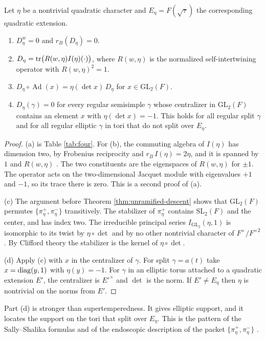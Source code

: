 \begin{theorem}\label{thm:Deta}Let $\eta$ be a nontrivial quadratic character and $E_\eta=F(\sqrt\tau)$ the corresponding quadratic extension.
\begin{enumerate}[label=(\alph*),leftmargin=*]
\item $D_\eta^w=0$ and $r_B(D_\eta)=0$.
\item $D_\eta=\operatorname{tr}\bigl(R(w,\eta)I(\eta)(\cdot)\bigr)$, where $R(w,\eta)$ is the normalized self-intertwining operator with $R(w,\eta)^2=1$.
\item $D_\eta\circ\operatorname{Ad}(x)=\eta(\det x)\,D_\eta$ for $x\in\mathrm{GL}_2(F)$.
\item $D_\eta(\gamma)=0$ for every regular semisimple $\gamma$ whose centralizer in $\mathrm{GL}_2(F)$ contains an element $x$ with $\eta(\det x)=-1$. This holds for all regular split $\gamma$ and for all regular elliptic $\gamma$ in tori that do not split over $E_\eta$.
\end{enumerate}
\end{theorem}
\begin{proof}
(a) is Table \ref{tab:four}. For (b), the commuting algebra of $I(\eta)$ has dimension two, by Frobenius reciprocity and $r_B\,I(\eta)=2\eta$, and it is spanned by $1$ and $R(w,\eta)$ \cite{Ke82}. The two constituents are the eigenspaces of $R(w,\eta)$ for $\pm1$. The operator acts on the two-dimensional Jacquet module with eigenvalues $+1$ and $-1$, so its trace there is zero. This is a second proof of (a).

(c) The argument before Theorem \ref{thm:unramified-descent} shows that $\mathrm{GL}_2(F)$ permutes $\{\pi_\eta^+,\pi_\eta^-\}$ transitively. The stabilizer of $\pi_\eta^+$ contains $\mathrm{SL}_2(F)$ and the center, and has index two. The irreducible principal series $I_{\mathrm{GL}_2}(\eta,1)$ is isomorphic to its twist by $\eta\circ\det$ and by no other nontrivial character of $F^\times/F^{\times2}$. By Clifford theory the stabilizer is the kernel of $\eta\circ\det$.

(d) Apply (c) with $x$ in the centralizer of $\gamma$. For split $\gamma=a(t)$ take $x=\operatorname{diag}(y,1)$ with $\eta(y)=-1$. For $\gamma$ in an elliptic torus attached to a quadratic extension $E'$, the centralizer is $E'^\times$ and $\det$ is the norm. If $E'\ne E_\eta$ then $\eta$ is nontrivial on the norms from $E'$.
\end{proof}
Part (d) is stronger than supertemperedness. It gives elliptic support, and it locates the support on the tori that split over $E_\eta$. This is the pattern of the Sally--Shalika formulas \cite{SS68} and of the endoscopic description of the packet $\{\pi_\eta^+,\pi_\eta^-\}$ \cite{LL79}.

